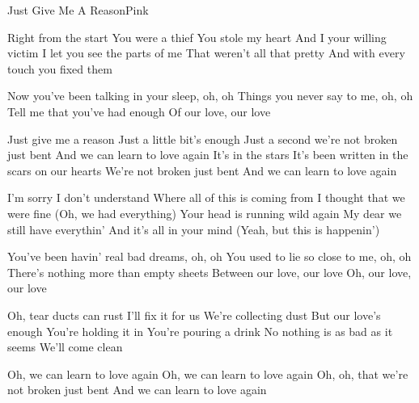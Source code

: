\documentclass[a4paper,11pt,french]{article}
\begin{document}
\begin{Song}{Just Give Me A Reason}{Pink}
\begin{multicols}{2}

\begin{Verse}
Right from the start
You were a thief
You stole my heart
And I your willing victim
I let you see the parts of me
That weren't all that pretty
And with every touch you fixed them
\end{Verse}
\espaceInterStrophe

\begin{PreChorus}
Now you've been talking in your sleep, oh, oh
Things you never say to me, oh, oh
Tell me that you've had enough
Of our love, our love
\end{PreChorus}
\espaceInterStrophe

\begin{Chorus}
Just give me a reason
Just a little bit's enough
Just a second we're not broken just bent
And we can learn to love again
It's in the stars
It's been written in the scars on our hearts
We're not broken just bent
And we can learn to love again
\end{Chorus}
\espaceInterStrophe

\begin{Verse}
I'm sorry I don't understand
Where all of this is coming from
I thought that we were fine
(Oh, we had everything)
Your head is running wild again
My dear we still have everythin'
And it's all in your mind
(Yeah, but this is happenin')
\end{Verse}
\espaceInterStrophe

\begin{PreChorus}
You've been havin' real bad dreams, oh, oh
You used to lie so close to me, oh, oh
There's nothing more than empty sheets
Between our love, our love
Oh, our love, our love
\end{PreChorus}
\espaceInterStrophe

\tochorus
\espaceInterStrophe

\begin{Bridge}
Oh, tear ducts can rust
I'll fix it for us
We're collecting dust
But our love's enough
You're holding it in
You're pouring a drink
No nothing is as bad as it seems
We'll come clean
\end{Bridge}
\espaceInterStrophe

\tochorus[x2]
\espaceInterStrophe

\begin{Chorus}
Oh, we can learn to love again
Oh, we can learn to love again
Oh, oh, that we're not broken just bent
And we can learn to love again
\end{Chorus}


\end{multicols}
\end{Song}
\end{document}
